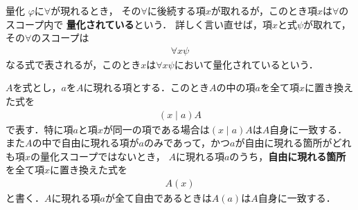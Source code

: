 	\begin{itembox}[l]{量化}
		$\varphi$に$\forall$が現れるとき，
		その$\forall$に後続する項$x$が取れるが，このとき項$x$は$\forall$のスコープ内で
		{\bf 量化されている}という．
		詳しく言い直せば，項$x$と式$\psi$が取れて，その$\forall$のスコープは
		\begin{align}
			\forall x \psi
		\end{align}
		なる式で表されるが，このとき$x$は$\forall x \psi$において量化されているという．
	\end{itembox}
	
	$A$を式とし，$a$を$A$に現れる項とする．このとき$A$の中の項$a$を全て項$x$に置き換えた式を
	\begin{align}
		(x \mid a)A
	\end{align}
	で表す．特に項$a$と項$x$が同一の項である場合は$(x \mid a)A$は$A$自身に一致する．
	また$A$の中で自由に現れる項が$a$のみであって，かつ$a$が自由に現れる箇所がどれも項$x$の量化スコープではないとき，
	$A$に現れる項$a$のうち，{\bf 自由に現れる箇所}を全て項$x$に置き換えた式を
	\begin{align}
		A(x)
	\end{align}
	と書く．$A$に現れる項$a$が全て自由であるときは$A(a)$は$A$自身に一致する．
